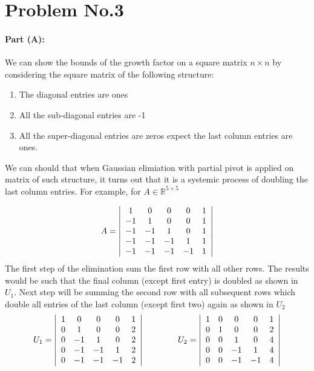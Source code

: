 \section*{Problem No.3} \label{sec:prob3}

\paragraph{Part (A):} We can show the bounds of the growth factor on a square matrix $n \times n$ by considering the square matrix of the following structure:
\begin{enumerate}
\item The diagonal entries are ones
\item All the sub-diagonal entries are -1
\item All the super-diagonal entries are zeros expect the last column entries are ones.
\end{enumerate} 

We can should that when Gaussian elimiation with partial pivot is applied on matrix of such structure, it turns out that it is a systemic process of doubling the last column entries. For example, for $A \in \mathbb{R}^{5\times 5}$

\[A =
\left| 
\begin{array}{cc cc c}
 1 &  0 &  0 &  0 & 1  \\
-1 &  1 &  0 &  0 & 1  \\
-1 & -1 &  1 &  0 & 1  \\
-1 & -1 & -1 &  1 & 1  \\
-1 & -1 & -1 & -1 & 1  \\
\end{array} 
\right|
\] 
The first step of the elimination sum the first row with all other rows. The results would be such that the final column (except first entry) is doubled as shown in $U_{1}$. Next step will be summing the second row with all subsequent rows which double all entries of the last column (except first two) again as shown in $U_{2}$
\[U_{1} =
\left| 
\begin{array}{cc cc c}
1 &  0 &  0 &  0 & 1  \\
0 &  1 &  0 &  0 & 2  \\
0 & -1 &  1 &  0 & 2  \\
0 & -1 & -1 &  1 & 2  \\
0 & -1 & -1 & -1 & 2  \\
\end{array} 
\right| \quad \quad \quad \quad
U_{2} =
\left| 
\begin{array}{cc cc c}
1 &  0 &  0 &  0 & 1  \\
0 &  1 &  0 &  0 & 2  \\
0 &  0 &  1 &  0 & 4  \\
0 &  0 & -1 &  1 & 4  \\
0 &  0 & -1 & -1 & 4  \\
\end{array} 
\right|
\] 

